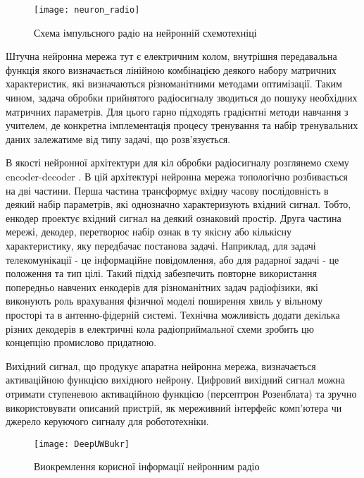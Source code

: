 \begin{figure}[htbp] \begin{center}
\texttt{[image: neuron\_radio]}
\caption{Схема імпульсного радіо на нейронній схемотехніці} 
\label{fig:neural_radio}
\end{center} \end{figure}

Штучна нейронна мережа тут є електричним колом, внутрішня передавальна 
функція якого визначається лінійною комбінацією деякого набору матричних 
характеристик, які визначаються різноманітними методами оптимізації. Таким 
чином, задача обробки прийнятого радіосигналу зводиться до пошуку необхідних 
матричних параметрів. Для цього гарно підходять градієнтні методи навчання 
з учителем, де конкретна імплементація процесу тренування та набір 
тренувальних даних залежатиме від типу задачі, що розв'язується.

В якості нейронної архітектури для кіл обробки радіосигналу розглянемо
схему encoder-decoder \cite{imp:Ying2017}. 
В цій архітектурі нейронна мережа топологічно розбивається на 
дві частини. Перша частина трансформує вхідну часову послідовність в деякий 
набір параметрів, які однозначно характеризують вхідний сигнал. Тобто, 
енкодер проектує вхідний сигнал на деякий ознаковий простір. Друга частина 
мережі, декодер, перетворює набір ознак в ту якісну або кількісну 
характеристику, яку передбачає постанова задачі. Наприклад, для задачі 
телекомунікації - це інформаційне повідомлення, або для радарної 
задачі - це положення та тип цілі. Такий підхід забезпечить повторне 
використання попередньо навчених енкодерів для різноманітних задач 
радіофізики, які виконують роль врахування фізичної моделі поширення хвиль 
у вільному просторі та в антенно-фідерній системі. Технічна можливість 
додати декілька різних декодерів в електричні кола радіоприймальної схеми 
зробить цю концепцію промислово придатною.

Вихідний сигнал, що продукує апаратна нейронна мережа, визначається 
активаційною функцією вихідного нейрону. Цифровий вихідний сигнал можна 
отримати ступеневою активаційною функцією (персептрон Розенблата) та зручно 
використовувати описаний пристрій, як мереживний інтерфейс комп'ютера чи 
джерело керуючого сигналу для робототехніки.

\begin{figure}[htbp] \begin{center}
\texttt{[image: DeepUWBukr]}
\caption{Виокремлення корисної інформації нейронним радіо} 
\label{fig:DeepUWB}
\end{center} \end{figure}

